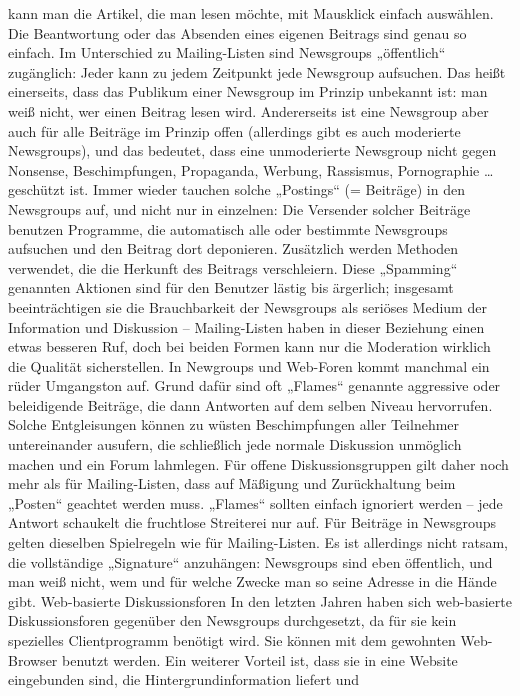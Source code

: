 \documentclass[]{book}
\theoremstyle{definition}
\theoremstyle{definition}
\theoremstyle{definition}
\theoremstyle{remark}
\begin{document}
kann man die Artikel, die man lesen möchte, mit Mausklick einfach
auswählen. Die Beantwortung oder das Absenden eines eigenen Beitrags
sind genau so einfach. Im Unterschied zu Mailing-Listen sind Newsgroups
„öffentlich`` zugänglich: Jeder kann zu jedem Zeitpunkt jede Newsgroup
aufsuchen. Das heißt einerseits, dass das Publikum einer Newsgroup im
Prinzip unbekannt ist: man weiß nicht, wer einen Beitrag lesen wird.
Andererseits ist eine Newsgroup aber auch für alle Beiträge im Prinzip
offen (allerdings gibt es auch moderierte Newsgroups), und das bedeutet,
dass eine unmoderierte Newsgroup nicht gegen Nonsense, Beschimpfungen,
Propaganda, Werbung, Rassismus, Pornographie \ldots{} geschützt ist.
Immer wieder tauchen solche „Postings`` (= Beiträge) in den Newsgroups
auf, und nicht nur in einzelnen: Die Versender solcher Beiträge benutzen
Programme, die automatisch alle oder bestimmte Newsgroups aufsuchen und
den Beitrag dort deponieren. Zusätzlich werden Methoden verwendet, die
die Herkunft des Beitrags verschleiern. Diese „Spamming`` genannten
Aktionen sind für den Benutzer lästig bis ärgerlich; insgesamt
beeinträchtigen sie die Brauchbarkeit der Newsgroups als seriöses Medium
der Information und Diskussion -- Mailing-Listen haben in dieser
Beziehung einen etwas besseren Ruf, doch bei beiden Formen kann nur die
Moderation wirklich die Qualität sicherstellen. In Newgroups und
Web-Foren kommt manchmal ein rüder Umgangston auf. Grund dafür sind oft
„Flames`` genannte aggressive oder beleidigende Beiträge, die dann
Antworten auf dem selben Niveau hervorrufen. Solche Entgleisungen können
zu wüsten Beschimpfungen aller Teilnehmer untereinander ausufern, die
schließlich jede normale Diskussion unmöglich machen und ein Forum
lahmlegen. Für offene Diskussionsgruppen gilt daher noch mehr als für
Mailing-Listen, dass auf Mäßigung und Zurückhaltung beim „Posten``
geachtet werden muss. „Flames`` sollten einfach ignoriert werden -- jede
Antwort schaukelt die fruchtlose Streiterei nur auf. Für Beiträge in
Newsgroups gelten dieselben Spielregeln wie für Mailing-Listen. Es ist
allerdings nicht ratsam, die vollständige „Signature`` anzuhängen:
Newsgroups sind eben öffentlich, und man weiß nicht, wem und für welche
Zwecke man so seine Adresse in die Hände gibt. Web-basierte
Diskussionsforen In den letzten Jahren haben sich web-basierte
Diskussionsforen gegenüber den Newsgroups durchgesetzt, da für sie kein
spezielles Clientprogramm benötigt wird. Sie können mit dem gewohnten
Web-Browser benutzt werden. Ein weiterer Vorteil ist, dass sie in eine
Website eingebunden sind, die Hintergrundinformation liefert und
\end{document}
